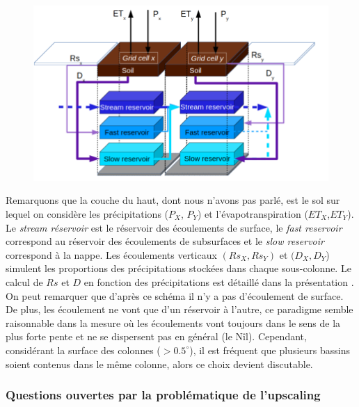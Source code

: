 \documentclass[a4paper,11pt]{article}
\numberwithin{equation}{section}
\begin{document}
\begin{figure}[H]
	\begin{center}
		\includegraphics[scale=0.3]{Orchidee_interaction.png}
	\end{center}
	\label{fig-Orchidee-interact}
\end{figure}

Remarquons que la couche du haut, dont nous n'avons pas parlé, est le sol sur lequel on considère les précipitations ($P_X$, $P_Y$) et l'évapotranspiration ($ET_X$,$ET_Y$). Le \textit{stream réservoir} est le réservoir des écoulements de surface, le \textit{fast reservoir} correspond au réservoir des écoulements de subsurfaces et le \textit{slow reservoir} correspond à la nappe. Les écoulements verticaux $(Rs_X,Rs_Y)$ et $(D_X,D_Y$) simulent les proportions des précipitations stockées dans chaque sous-colonne. Le calcul de $Rs$ et $D$ en fonction des précipitations est détaillé dans la présentation \cite{gumiberteau2017}. On peut remarquer que d'après ce schéma il n'y a pas d'écoulement de surface.
De plus, les écoulement ne vont que d'un réservoir à l'autre, ce paradigme semble raisonnable dans la mesure où les écoulements vont toujours dans le sens de la plus forte pente et ne se dispersent pas en général (le Nîl). Cependant, considérant la surface des colonnes ($>0.5^{\circ}$), il est fréquent que plusieurs bassins soient contenus dans le même colonne, alors ce choix devient discutable.

\subsubsection{Questions ouvertes par la problématique de l'upscaling}
\end{document}
